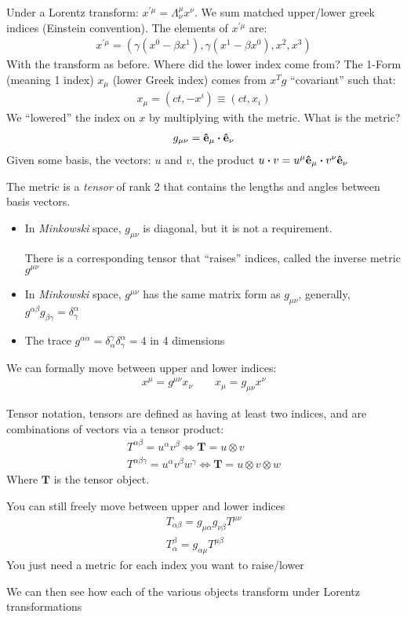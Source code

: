 Under a Lorentz transform: $x^{\prime\mu}=\Lambda^\mu_\nu x^\nu$. We sum matched upper/lower greek indices (Einstein convention). The elements of $x^{\prime\mu}$ are:
\begin{align*}
  x^{\prime\mu}=(\gamma(x^0-\beta x^1),\gamma(x^1-\beta x^0),x^2,x^3)
\end{align*}
With the transform as before. Where did the lower index come from? The 1-Form (meaning 1 index) $x_\mu$ (lower Greek index) comes from $x^Tg$ ``covariant'' such that:
\begin{align*}
  x_\mu=(ct,-x^i)\equiv (ct,x_i)
\end{align*}
We ``lowered'' the index on $x$ by multiplying with the metric. What is the metric?
\begin{align*}
  g_{\mu\nu}=\vu{e}_\mu\vdot\vu{e}_\nu
\end{align*}
Given some basis, the vectors: $u$ and $v$, the product $u\vdot v=u^\mu\vu{e}_\mu\vdot v^\nu\vu{e}_\nu$

\begin{definition}
  The metric is a \emph{tensor} of rank 2 that contains the lengths and angles between basis vectors.
  \begin{itemize}
  \item In \emph{Minkowski} space, $g_{\mu\nu}$ is diagonal, but it is not a requirement.

    There is a corresponding tensor that ``raises'' indices, called the inverse metric $g^{\mu\nu}$
  \item In \emph{Minkowski} space, $g^{\mu\nu}$ has the same matrix form as $g_{\mu\nu}$, generally, $g^{\alpha\beta}g_{\beta\gamma}=\delta^{\alpha}_\gamma$
  \item The trace $g^{\alpha\alpha}=\delta^\gamma_\alpha\delta^\alpha_\gamma=4$ in 4 dimensions
  \end{itemize}
\end{definition}
We can formally move between upper and lower indices:
\begin{align*}
  x^\mu=g^{\mu\nu}x_\nu\qquad x_\mu=g_{\mu\nu}x^\nu
\end{align*}
\begin{note}
  Tensor notation, tensors are defined as having at least two indices, and are combinations of vectors via a tensor product:
  \begin{gather*}
    T^{\alpha\beta}=u^\alpha v^\beta\iff \bm{T}=u\otimes v\\
    T^{\alpha\beta\gamma}=u^\alpha v^\beta w^\gamma\iff \bm{T}=u\otimes v\otimes w
  \end{gather*}
  Where $\bm{T}$ is the tensor object.

  You can still freely move between upper and lower indices
  \begin{gather*}
    T_{\alpha\beta}=g_{\mu\alpha}g_{\nu\beta}T^{\mu\nu}\\
    T_\alpha^\beta=g_{\alpha\mu}T^{\mu\beta}
  \end{gather*}
  You just need a metric for each index you want to raise/lower
\end{note}
We can then see how each of the various objects transform under Lorentz transformations

